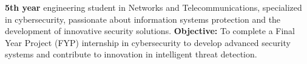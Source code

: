 
\begin{cvparagraph}

    \textbf{5th year} engineering student in Networks and Telecommunications, specialized in cybersecurity, passionate about information systems protection and the development of innovative security solutions.
    \newline
    \textbf{Objective:} To complete a Final Year Project (FYP) internship in cybersecurity to develop advanced security systems and contribute to innovation in intelligent threat detection.

\end{cvparagraph}
